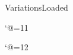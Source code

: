 %
%
%
%
%

\csname VariationsLoaded\endcsname
\let\VariationsLoaded\endinput

\catcode`@=11

\newcount\sc@le {}
\newdimen\p@int \p@int=1pt



\catcode`@=12

\endinput
